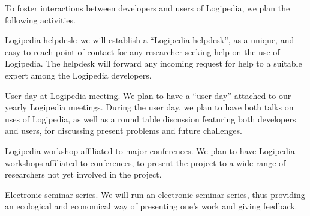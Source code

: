 \begin{workpackage}[id=dissemination,type=MGT,wphases=1-48,
  short={Dissemination},
  title={Dissemination, communication and exploitation},
  lead=Lie,LieRM=3,InrRM=6,BirRM=4,CleRM=2,ImtRM=2,StrRM=2,ZibRM=14,EduRM=12]
\begin{tasklist}
  \begin{task}[id=researchers-club,
      title=Expanding the use of Logipedia in research,
      shorttitle=Research,
      lead=Bir,BirRM=2,wphases=1-48!.05]
     To foster interactions between developers and users of Logipedia, we plan the following activities.
    \begin{compactitem}
     \item Logipedia helpdesk:
    we will establish a ``Logipedia helpdesk'', as a unique, and easy-to-reach point of contact for any researcher seeking help on the use of Logipedia.
     The helpdesk will forward any incoming request for help to a suitable expert among the Logipedia developers.
     \item User day at Logipedia meeting.
     We plan to have a ``user day'' attached to our yearly Logipedia meetings.
     During the user day, we plan to have both talks on uses of Logipedia, as well as a round table discussion featuring both developers and users, for discussing present problems and future challenges.
     \item Logipedia workshop affiliated to major conferences.
     We plan to have Logipedia workshops affiliated to conferences, to present the project to a wide range of researchers not yet involved in the project.
     \item Electronic seminar series.
     We will run an electronic seminar series, thus providing an ecological and economical way of presenting one's work and giving feedback.
    \end{compactitem}
  \end{task}


\end{tasklist}
\end{workpackage}
